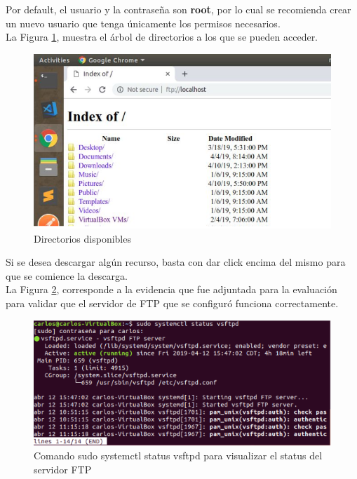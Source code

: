 \noindent
Por default, el usuario y la contraseña son \textbf{root}, por lo cual se recomienda crear un nuevo usuario que tenga únicamente los permisos necesarios.\\

\noindent
La Figura \ref{fig:ftp6}, muestra el árbol de directorios a los que se pueden acceder.

\begin{figure}[H]
    \centering
    \includegraphics[scale=.75]{imagenes/primero/cliente_ftp2.PNG}
    \caption{Directorios disponibles}
    \label{fig:ftp6}
\end{figure}

\noindent
Si se desea descargar algún recurso, basta con dar click encima del mismo para que se comience la descarga.\\

\noindent
La Figura \ref{fig:ftp7}, corresponde a la evidencia que fue adjuntada para la evaluación para validar que el servidor de FTP que se configuró funciona correctamente.

\begin{figure}[H]
    \centering
    \includegraphics[scale=.75]{imagenes/primero/servidor_ftp.PNG}
    \caption{Comando sudo systemctl status vsftpd para visualizar el status del servidor FTP}
    \label{fig:ftp7}
\end{figure}

